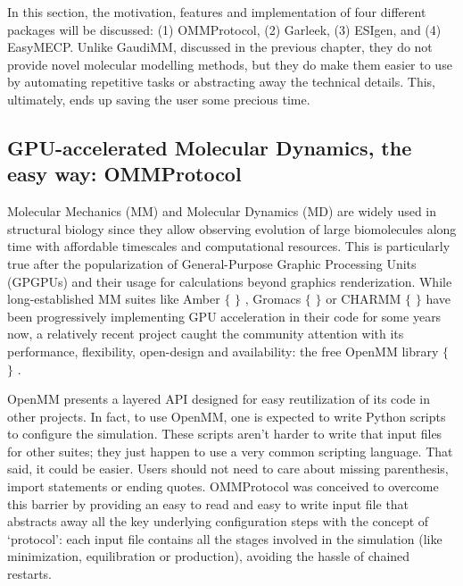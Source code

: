 In this section, the motivation, features and implementation of four different packages will be discussed: (1) OMMProtocol, (2) Garleek, (3) ESIgen, and (4) EasyMECP. Unlike GaudiMM, discussed in the previous chapter, they do not provide novel molecular modelling methods, but they do make them easier to use by automating repetitive tasks or abstracting away the technical details. This, ultimately, ends up saving the user some precious time.

\subsection{GPU-accelerated Molecular Dynamics, the easy way: OMMProtocol}




Molecular Mechanics (MM) and Molecular Dynamics (MD) are widely used in structural biology since they allow observing evolution of large biomolecules along time with affordable timescales and computational resources. This is particularly true after the popularization of General-Purpose Graphic Processing Units (GPGPUs) and their usage for calculations beyond graphics renderization. While long-established MM suites like Amber $ \{ $ $ \} $ , Gromacs $ \{ $ $ \} $  or CHARMM $ \{ $ $ \} $  have been progressively implementing GPU acceleration in their code for some years now, a relatively recent project caught the community attention with its performance, flexibility, open-design and availability: the free OpenMM library $ \{ $ $ \} $ .

OpenMM presents a layered API designed for easy reutilization of its code in other projects. In fact, to use OpenMM, one is expected to write Python scripts to configure the simulation. These scripts aren’t harder to write that input files for other suites; they just happen to use a very common scripting language. That said, it could be easier. Users should not need to care about missing parenthesis, import statements or ending quotes. OMMProtocol was conceived to overcome this barrier by providing an easy to read and easy to write input file that abstracts away all the key underlying configuration steps with the concept of ‘protocol’: each input file contains all the stages involved in the simulation (like minimization, equilibration or production), avoiding the hassle of chained restarts.

